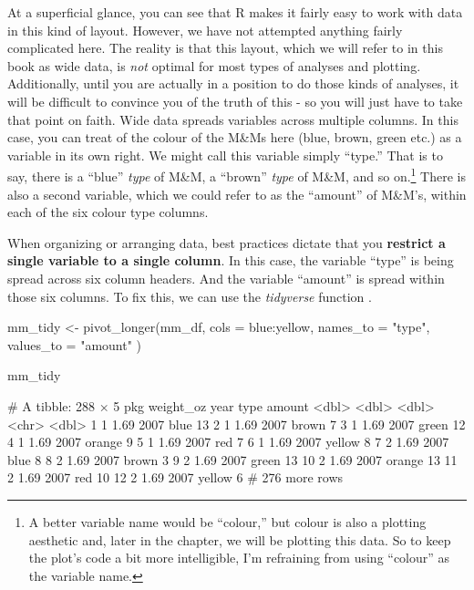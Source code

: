 At a superficial glance, you can see that R makes it fairly easy to work with data in this kind of layout. However, we have not attempted anything fairly complicated here. The reality is that this layout, which we will refer to in this book as \gls{wide data}, is \textit{not} optimal for most types of analyses and plotting. Additionally, until you are actually in a position to do those kinds of analyses, it will be difficult to convince you of the truth of this - so you will just have to take that point on faith. Wide data spreads variables across multiple columns. In this case, you can treat of the colour of the M\&Ms here (blue, brown, green etc.) as a variable in its own right. We might call this variable simply ``type.'' That is to say, there is a ``blue'' \textit{type} of  M\&M, a ``brown'' \textit{type} of  M\&M, and so on.\footnote{A better variable name would be ``colour,'' but colour is also a plotting aesthetic and, later in the chapter, we will be plotting this data.  So to keep the plot's code a bit more intelligible, I'm refraining from using ``colour'' as the variable name.} There is also a second variable, which we could refer to as the ``amount'' of M\&M's, within each of the six colour type columns.

When organizing or arranging data, best practices dictate that you \textbf{restrict a single variable to a single column}. In this case, the variable ``type'' is being spread across six column headers. And the variable ``amount'' is spread within those six columns. To fix this, we can use the \textit{tidyverse} function .

\begin{inR}
mm_tidy <- pivot_longer(mm_df,
  cols = blue:yellow,
  names_to = "type", values_to = "amount"
)

mm_tidy
\end{inR}
\begin{outR}
# A tibble: 288 × 5
     pkg weight_oz  year type   amount
   <dbl>     <dbl> <dbl> <chr>   <dbl>
 1     1      1.69  2007 blue       13
 2     1      1.69  2007 brown       7
 3     1      1.69  2007 green      12
 4     1      1.69  2007 orange      9
 5     1      1.69  2007 red         7
 6     1      1.69  2007 yellow      8
 7     2      1.69  2007 blue        8
 8     2      1.69  2007 brown       3
 9     2      1.69  2007 green      13
10     2      1.69  2007 orange     13
11     2      1.69  2007 red        10
12     2      1.69  2007 yellow      6
# 276 more rows
\end{outR}

